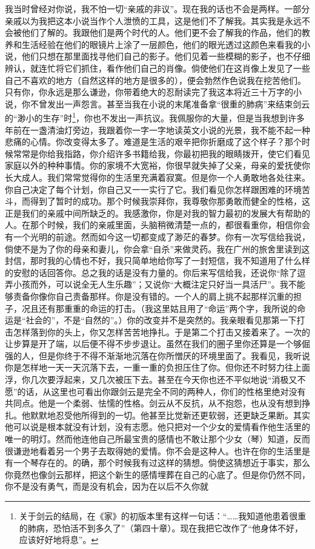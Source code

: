 \par 我当时曾经对你说，我不怕一切“亲戚的非议”。现在我的话也不会是两样。一部分亲戚以为我把这本小说当作个人泄愤的工具，这是他们不了解我。其实我是永远不会被他们了解的。我跟他们是两个时代的人。他们更不会了解我的作品，他们的教养和生活经验在他们的眼镜片上涂了一层颜色，他们的眼光透过这颜色来看我的小说，他们只想在那里面找寻他们自己的影子。他们见着一些模糊的影子，也不仔细辨认，就连忙将它们抓住，看作他们自己的肖像。倘使他们在这肖像上发见了一些自己不喜欢的地方（自然这样的地方是很多的），便会勃然作色说我在挖苦他们。只有你，你永远是那么谦逊，你带着绝大的忍耐读完了我这本将近三十万字的小说，你不曾发出一声怨言。甚至当我在小说的末尾准备拿“很重的肺病”来结束剑云的“渺小的生存”时\footnote{关于剑云的结局，在《家》的初版本里有这样一句话：“……我知道他患着很重的肺病，恐怕活不到多久了”（第四十章）。现在我把它改作了“他身体不好，应该好好地将息”。}，你也不发出一声抗议。我佩服你的大量，但是当我想到许多年前在一盏清油灯旁边，我跟着你一字一字地读英文小说的光景，我不能不起一种悲痛的心情。你改变得太多了。难道是生活的艰辛把你折磨成了这个样子？那个时候常常是你给我指路，你介绍许多书籍给我，你最初把我的眼睛拨开，使它们看见家庭以外的种种事情。你的家境不大宽裕，你很早就失掉了父亲，母亲的爱抚使你长大成人。我们常常觉得你的生活里充满着寂寞。但是你一个人勇敢地各处往来。你自己决定了每个计划，你自己又一一实行了它。我们看见你怎样跟困难的环境苦斗，而得到了暂时的成功。那个时候我崇拜你，我尊敬你那勇敢而健全的性格，这正是我们的亲戚中间所缺乏的。我感激你，你是对我的智力最初的发展大有帮助的人。在那个时候，我们的亲戚里面，头脑稍微清楚一点的，都很看重你，相信你会有一个光明的前途。然而如今这一切都变成了渺茫的春梦。你有一次写信给我说，倘使不是为了你的母亲和妻儿，你会拿“自杀”来做灵药。我在广州的旅舍里读到这封信，那时我的心情也不好，我只简单地给你写了一封短信，我不知道用了什么样的安慰的话回答你。总之我的话是没有力量的。你后来写信给我，还说你“除了逗弄小孩而外，可以说全无人生乐趣”；又说你“大概注定只好当一具活尸”。我不能够责备你像你自己责备那样。你是没有错的。一个人的肩上挑不起那样沉重的担子，况且还有那重重的命运的打击。（我这里姑且用了“命运”两个字，我所说的命运是“社会的”，不是“自然的”。）你的改变并不是突然的。我亲眼看见那第一下打击怎样落到你的头上，你又怎样苦苦地挣扎。于是第二个打击又接着来了。一次的让步算是开了端，以后便不得不步步退让。虽然在我们的圈子里你还算是一个够倔强的人，但是你终于不得不渐渐地沉落在你所憎厌的环境里面了。我看见，我听说你是怎样地一天一天沉落下去，一重一重的负担压住了你。但你还不时努力往上面浮，你几次要浮起来，又几次被压下去。甚至在今天你也还不平似地说“消极又不愿”的话，从这里也可看出你跟剑云是完全不同的两种人，你们的性格里绝对没有共同点。他是一个柔弱、怯懦的性格。剑云从不反抗，从不抱怨，也从没有想到挣扎。他默默地忍受他所得到的一切。他甚至比觉新还更软弱，还更缺乏果断。其实他可以说是根本就没有计划，没有志愿。他只把对一个少女的爱情看作他生活里的唯一的明灯。然而他连他自己所最宝贵的感情也不敢让那个少女（琴）知道，反而很谦逊地看着另一个男子去取得她的爱情。你不会是这种人。也许在你的生活里是有一个琴存在的。的确，那个时候我有过这样的猜想。倘使这猜想近于事实，那么你竟然也像剑云那样，把这个新生的感情埋葬在自己的心底了。但是你仍然不同，你不是没有勇气，而是没有机会，因为在以后不久你就